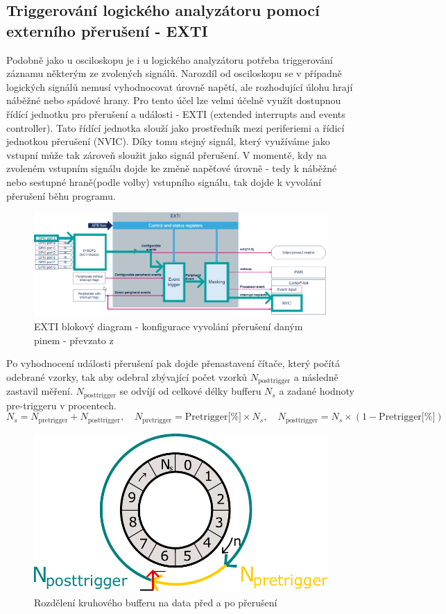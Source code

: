 \subsection{Triggerování logického analyzátoru pomocí externího přerušení - EXTI}
Podobně jako u osciloskopu je i u logického analyzátoru potřeba triggerování záznamu některým ze zvolených signálů. Narozdíl od osciloskopu se v případně logických signálů nemusí vyhodnocovat úrovně napětí, ale rozhodující úlohu hrají náběžné nebo spádové hrany. Pro tento účel lze velmi účelně využít dostupnou řídící jednotku pro přerušení a události - EXTI (extended interrupts and events controller). Tato řídící jednotka slouží jako prostředník mezi periferiemi a řídicí jednotkou přerušení (NVIC). Díky tomu stejný signál, který využíváme jako vstupní může tak zároveň sloužit jako signál přerušení. V momentě, kdy na zvoleném vstupním signálu dojde ke změně napěťové úrovně - tedy k náběžné nebo sestupné hraně(podle volby) vstupního signálu, tak dojde k vyvolání přerušení běhu programu.
\begin{figure}[H]
	\centering
	\includegraphics[width=1\linewidth]{Figs/Diagrams/SVG/EXTI}
	\caption{EXTI blokový diagram - konfigurace vyvolání přerušení daným pinem - převzato z \cite{G4EXTI}}
	\label{fig:exti}
\end{figure}

Po vyhodnocení události přerušení pak dojde přenastavení čítače, který počítá odebrané vzorky, tak aby odebral zbývající počet vzorků $N_{\text{posttrigger}}$ a následně zastavil měření. $N_{\text{posttrigger}}$ se odvíjí od celkové délky bufferu $N_s$ a zadané hodnoty pre-triggeru v procentech.
\begin{equation}
	N_s=N_{\text{pretrigger}}+N_{\text{posttrigger}}, \quad N_{\text{pretrigger}}=\text{Pretrigger[\%]} \times N_s, \quad N_{\text{posttrigger}}=N_s \times(1-\text{Pretrigger[\%]} )
\end{equation} 

\begin{figure}[H]
	\centering
	\includegraphics[width=0.6\linewidth]{Figs/Diagrams/SVG/CircularPostTrigger.pdf}
	\caption{Rozdělení kruhového bufferu na data před a po přerušení}
	\label{fig:exti}
\end{figure}

